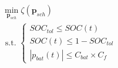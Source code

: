 \begin{equation}
\begin{split}
	&\min_{\textbf{p}_{sch}}\zeta(\textbf{p}_{sch}) \\
	&\text{ s.t. }
	\begin{cases}
		SOC_{tol} \leq SOC(t)\\
		SOC(t) \leq 1-SOC_{tol}\\
		|p_{bat}(t)| \leq C_{bat} \times C_{f}
	\end{cases}
\end{split}
\label{ch2:equ:cost-minimisation}
\end{equation}